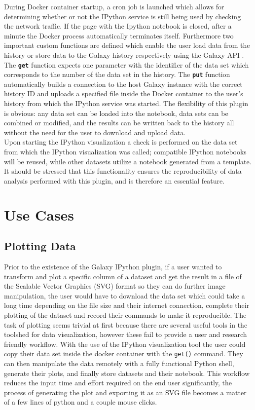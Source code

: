 \documentclass{bioinfo}
\begin{document}
\begin{methods}
During Docker container startup, a cron job is launched which allows for determining whether or not the IPython service is still being used by checking the network traffic. If the page with the Ipython notebook is closed, after a minute the Docker process automatically terminates itself. Furthermore two important custom functions are defined which enable the user load data from the history or store data to the Galaxy history respectively using the Galaxy API \citep{Sloggett2013}. The \textbf{\texttt{get}} function expects one parameter with the identifier of the data set which corresponds to the number of the data set in the history. The \textbf{\texttt{put}} function automatically builds a connection to the host Galaxy instance with the correct history ID and uploads a specified file inside the Docker container to the user's history from which the IPython service was started. The flexibility of this plugin is obvious: any data set can be loaded into the notebook, data sets can be combined or modified, and the results can be written back to the history all without the need for the user to download and upload data. \\
Upon starting the IPython visualization a check is performed on the data set from which the IPython visualization was called; compatible IPython notebooks will be reused, while other datasets utilize a notebook generated from a template. It should be stressed that this functionality ensures the reproducibility of data analysis performed with this plugin, and is therefore an essential feature.


\section{Use Cases}
\subsection{Plotting Data}
Prior to the existence of the Galaxy IPython plugin, if a user wanted to transform and plot a specific column of a dataset and get the result in a file of the Scalable Vector Graphics (SVG) format so they can do further image manipulation, the user would have to download the data set which could take a long time depending on the file size and their internet connection, complete their plotting of the dataset and record their commands to make it reproducible. The task of plotting seems trivial at first because there are several useful tools in the toolshed for data visualization, however these fail to provide a user and research friendly workflow. With the use of the IPython visualization tool the user could copy their data set inside the docker container with the \texttt{get()} command. They can then manipulate the data remotely with a fully functional Python shell, generate their plots, and finally store datasets and their notebook. This workflow reduces the input time and effort required on the end user significantly, the process of generating the plot and exporting it as an SVG file becomes a matter of a few lines of python and a couple mouse clicks.


\end{methods}
\end{document}
